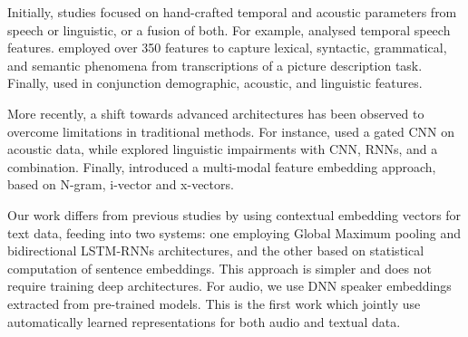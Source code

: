 Initially, studies focused on hand-crafted temporal and acoustic parameters from speech or linguistic, or a fusion of both. For example, \cite{konig2015automatic} analysed temporal speech features. \cite{fraser2016linguistic} employed over 350 features to capture lexical, syntactic, grammatical, and semantic phenomena from transcriptions of a picture description task. Finally, \cite{gosztolya2019identifying} used in conjunction demographic, acoustic, and linguistic features.

More recently, a shift towards advanced architectures has been observed to overcome limitations in traditional methods. For instance, \cite{warnita18_interspeech} used a gated \ac{CNN} on acoustic data, while \cite{karlekar-etal-2018-detecting} explored linguistic impairments with \ac{CNN}, \acp{RNN}, and a combination. Finally, \cite{zargarbashi2019multi} introduced a multi-modal feature embedding approach, based on N-gram, i-vector and x-vectors.

Our work differs from previous studies by using contextual embedding vectors for text data, feeding into two systems: one employing Global Maximum pooling and bidirectional \ac{LSTM}-\acp{RNN} architectures, and the other based on statistical computation of sentence embeddings. This approach is simpler and does not require training deep architectures. For audio, we use \ac{DNN} speaker embeddings extracted from pre-trained models. This is the first work which jointly use automatically learned representations for both audio and textual data.
